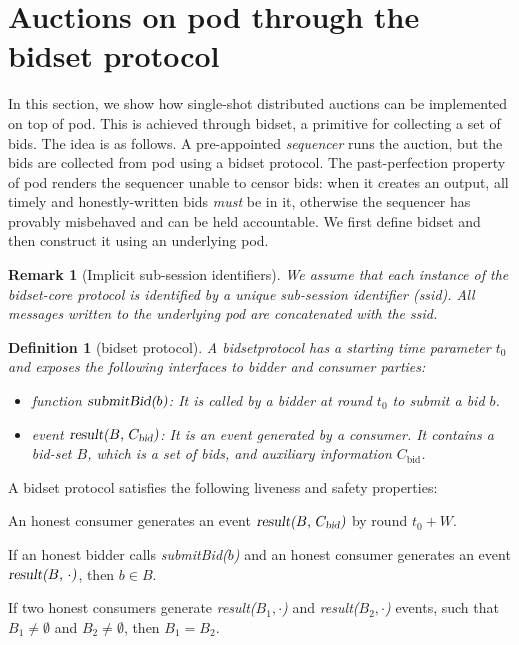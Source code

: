 \documentclass[pdflatex,sn-mathphys-num]{sn-jnl}%
\theoremstyle{thmstyleone}%
\theoremstyle{thmstyletwo}%
\newtheorem{remark}{Remark}%
\theoremstyle{thmstylethree}%
\newtheorem{definition}{Definition}%
\newcommand{\podtm}{\textsf{pod}\xspace}
\newcommand{\bidsettm}{\textsf{bidset}\xspace}
\newcommand{\bidcert}{\ensuremath{C_\text{bid}}\xspace}
\newcommand{\op}[1]{\textsl{#1}}
\newcommand{\parAuctionTerm}{\ensuremath{W}\xspace}
\newcommand{\tzero}{\ensuremath{t_0}\xspace}
\newcommand{\bag}{\ensuremath{B}\xspace}
\newcommand{\opResult}[1]{\op{result(#1)}\xspace}
\newcommand{\opSubmitBid}[1]{\op{submitBid(#1)}\xspace}
\newcommand{\bid}{\ensuremath{b}\xspace}
\begin{document}
\section{Auctions on \podtm through the \bidsettm protocol}\label{sec:auctions}
In this section, we show how single-shot distributed auctions can be implemented on top of \podtm.
This is achieved through \bidsettm, a primitive for collecting a set of bids.
The idea is as follows. A pre-appointed \emph{sequencer} runs the auction, but the bids are collected from \podtm using a \bidsettm protocol. The past-perfection property of \podtm renders the sequencer unable to censor bids: when it creates an output, all timely and honestly-written bids \emph{must} be in it, otherwise the sequencer has provably misbehaved and can be held accountable.
We first define \bidsettm and then construct it using an underlying \podtm.

\begin{remark}[Implicit sub-session identifiers]
	We assume that each instance of the \bidsettm-core protocol is identified by a unique sub-session identifier (ssid). All messages written to the underlying \podtm are concatenated with the ssid.
\end{remark}

\begin{definition}[\bidsettm protocol]\label{def:auction-framework}
    A \bidsettm \emph{protocol} has a \emph{starting time} parameter \tzero and exposes the following interfaces to \emph{bidder} and \emph{consumer} parties:
    \begin{itemize}
        \item function $\opSubmitBid{\bid}$: It is called by a bidder at round \tzero to submit a bid \bid.
        \item event $\opResult{\bag, \bidcert}$: It is an event generated by a consumer. It contains a \emph{bid-set} \bag, which is a set of bids, and auxiliary information \bidcert.
    \end{itemize}
\end{definition}

\noindent
A \bidsettm protocol satisfies the following liveness and safety properties:
\begin{description}[leftmargin=4mm, labelindent=4mm]
    \item[(Liveness) Termination within \parAuctionTerm:]
    An honest consumer generates an event $\opResult{\bag, \bidcert}$ by round $\tzero + \parAuctionTerm$.

    \item [(Safety) Censorship resistance:]
    If an honest bidder calls \opSubmitBid{\bid}
    and an honest consumer generates an event $\opResult{\bag, $\cdot$}$,
    then $\bid \in \bag$.

    \item[(Safety) Weak consistency:]
    If two honest consumers generate \opResult{$\bag_1, \cdot$} and \opResult{$\bag_2, \cdot$} events, such that $\bag_1 \neq \emptyset$ and $\bag_2 \neq \emptyset$, then $\bag_1 = \bag_2$.
\end{description}
\end{document}
